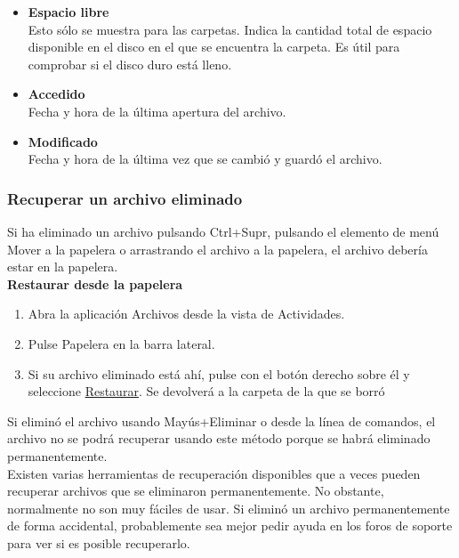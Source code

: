\begin{itemize}
\item {\bf Espacio libre}\\
Esto sólo se muestra para las carpetas. Indica la cantidad total de espacio disponible en el disco en el que se encuentra la carpeta. Es útil para comprobar si el disco duro está lleno.
\item {\bf Accedido}\\
Fecha y hora de la última apertura del archivo.
\item {\bf Modificado}\\
Fecha y hora de la última vez que se cambió y guardó el archivo.
\end{itemize}
\subsubsection{Recuperar un archivo eliminado}
Si ha eliminado un archivo pulsando Ctrl+Supr, pulsando el elemento de menú Mover a la papelera o arrastrando el archivo a la papelera, el archivo debería estar en la papelera.\\

{\bf Restaurar desde la papelera}
\begin{enumerate}
\item Abra la aplicación Archivos desde la vista de Actividades.
\item Pulse Papelera en la barra lateral.
\item Si su archivo eliminado está ahí, pulse con el botón derecho sobre él y seleccione \underline{Restaurar}. Se devolverá a la carpeta de la que se borró
\end{enumerate}
Si eliminó el archivo usando Mayús+Eliminar o desde la línea de comandos, el archivo no se podrá recuperar usando este método porque se habrá eliminado permanentemente.\\
Existen varias herramientas de recuperación disponibles que a veces pueden recuperar archivos que se eliminaron permanentemente. No obstante, normalmente no son muy fáciles de usar. Si eliminó un archivo permanentemente de forma accidental, probablemente sea mejor pedir ayuda en los foros de soporte para ver si es posible recuperarlo.

